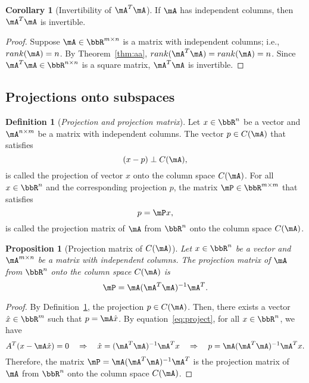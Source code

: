 \documentclass[11pt]{article}
\theoremstyle{plain}
\newtheorem{prop}{Proposition}
\theoremstyle{definition}
\newtheorem{defn}{Definition}
\newtheorem{cor}{Corollary}
\begin{document}
\begin{cor}[Invertibility of $\mA^T \mA$]\label{cor:invert}
	If $\mA$ has independent columns, then $\mA^T \mA$ is invertible.
\end{cor}
\begin{proof}
Suppose $\mA \in \bbR^{m \times n}$ is a matrix with independent columns; i.e., $rank(\mA) = n$. By Theorem~\ref{thm:aa}, $rank(\mA^T \mA) = rank(\mA) = n$. Since $\mA^T \mA \in \bbR^{n \times n}$ is a square matrix, $\mA^T \mA$ is invertible.
\end{proof}


\subsection{Projections onto subspaces}
\begin{defn}[\textit{Projection and projection matrix}]\label{def:project} Let  $x \in \bbR^{n}$ be a vector and $\mA^{n \times m}$ be a matrix with independent columns. The vector $p \in C(\mA)$ that satisfies
	\begin{equation}\label{eq:project}
		(x-p) \perp C(\mA),
	\end{equation} 
	is called the projection of vector $x$ onto the column space $C(\mA)$. For all $x \in \bbR^{n}$ and the corresponding projection $p$, the matrix $\mP \in \bbR^{m \times m}$ that satisfies
	\begin{equation}
		p = \mP x,
	\end{equation}
	is called the projection matrix of $\mA$ from $\bbR^n$ onto the column space  $C(\mA)$.
\end{defn}

\begin{prop}[Projection matrix of $C(\mA)$]\label{prop:project}
	Let  $x \in \bbR^{n}$ be a vector and $\mA^{m \times n}$ be a matrix with independent columns. The projection matrix of $\mA$ from $\bbR^n$ onto the column space  $C(\mA)$ is 
	\begin{equation}
		\mP =  \mA (\mA^T \mA)^{-1} \mA^T.
	\end{equation}
\end{prop}

\begin{proof}
	By Definition~\ref{def:project}, the projection $p \in C(\mA)$. Then, there exists a  vector $\hat x \in \bbR^m$ such that $p = \mA \hat x$.  By equation~\eqref{eq:project}, for all $x \in \bbR^n$, we have 
\[ A^T (x - \mA \hat x) = 0 \quad \Rightarrow  \quad \hat x = (\mA^T \mA)^{-1} \mA^T x \quad \Rightarrow \quad p = \mA (\mA^T \mA)^{-1} \mA^T  x. \]
Therefore, the matrix $\mP =  \mA (\mA^T \mA)^{-1} \mA^T$ is the projection matrix of $\mA$ from $\bbR^n$ onto the column space $C(\mA)$.
\end{proof}
 
\end{document}

